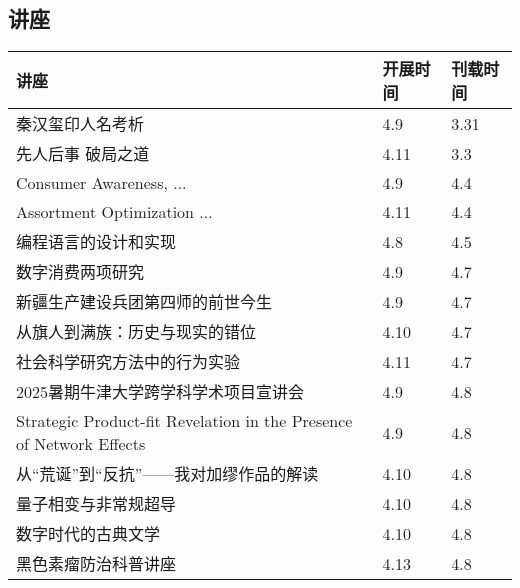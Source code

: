 \documentclass[letterpaper, 12pt]{article}
\begin{document}
\begin{multicols}{2}
\pagebreak

\section{讲座}
\begin{tabular}{|>{\centering\arraybackslash}m{}|m{}|m{}|}
    \hline
    讲座 & 开展时间 & 刊载时间\\
    \hline\hline
    秦汉玺印人名考析 & 4.9 & 3.31\\\hline
    先人后事 破局之道 & 4.11 & 3.3\\\hline
    Consumer Awareness, ... & 4.9 & 4.4\\\hline
    Assortment Optimization ... & 4.11 & 4.4\\\hline
    编程语言的设计和实现 & 4.8 & 4.5\\\hline
    数字消费两项研究 & 4.9 & 4.7\\\hline
    新疆生产建设兵团第四师的前世今生 & 4.9 & 4.7\\\hline
    从旗人到满族：历史与现实的错位 & 4.10 & 4.7\\\hline
    社会科学研究方法中的行为实验 & 4.11 & 4.7\\\hline
    2025暑期牛津大学跨学科学术项目宣讲会 & 4.9 & 4.8\\\hline
    Strategic Product-fit Revelation in the Presence of Network Effects & 4.9 & 4.8\\\hline
    从“荒诞”到“反抗”——我对加缪作品的解读 & 4.10 & 4.8\\\hline
    量子相变与非常规超导 & 4.10 & 4.8\\\hline
    数字时代的古典文学 & 4.10 & 4.8\\\hline
    黑色素瘤防治科普讲座 & 4.13 & 4.8\\\hline
\end{tabular}



\end{multicols}
\end{document}
